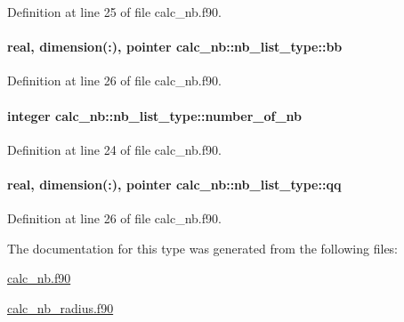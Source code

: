 Definition at line 25 of file calc\-\_\-nb.\-f90.

\hypertarget{structcalc__nb_1_1nb__list__type_ade080755ef1cc55afb08c326d7d65f90}{
\paragraph[{bb}]{\setlength{\rightskip}{0pt plus 5cm}real, dimension(\-:), pointer calc\-\_\-nb\-::nb\-\_\-list\-\_\-type\-::bb}}\label{structcalc__nb_1_1nb__list__type_ade080755ef1cc55afb08c326d7d65f90}


Definition at line 26 of file calc\-\_\-nb.\-f90.

\hypertarget{structcalc__nb_1_1nb__list__type_aeef1a1cda77d9cc96df57d5e328867c3}{
\paragraph[{number\-\_\-of\-\_\-nb}]{\setlength{\rightskip}{0pt plus 5cm}integer calc\-\_\-nb\-::nb\-\_\-list\-\_\-type\-::number\-\_\-of\-\_\-nb}}\label{structcalc__nb_1_1nb__list__type_aeef1a1cda77d9cc96df57d5e328867c3}


Definition at line 24 of file calc\-\_\-nb.\-f90.

\hypertarget{structcalc__nb_1_1nb__list__type_a7c9db0402cc4acb30b45bf031b0b401e}{
\paragraph[{qq}]{\setlength{\rightskip}{0pt plus 5cm}real, dimension(\-:), pointer calc\-\_\-nb\-::nb\-\_\-list\-\_\-type\-::qq}}\label{structcalc__nb_1_1nb__list__type_a7c9db0402cc4acb30b45bf031b0b401e}


Definition at line 26 of file calc\-\_\-nb.\-f90.



The documentation for this type was generated from the following files\-:\begin{DoxyCompactItemize}
\item 
\hyperlink{calc__nb_8f90}{calc\-\_\-nb.\-f90}\item 
\hyperlink{calc__nb__radius_8f90}{calc\-\_\-nb\-\_\-radius.\-f90}\end{DoxyCompactItemize}
